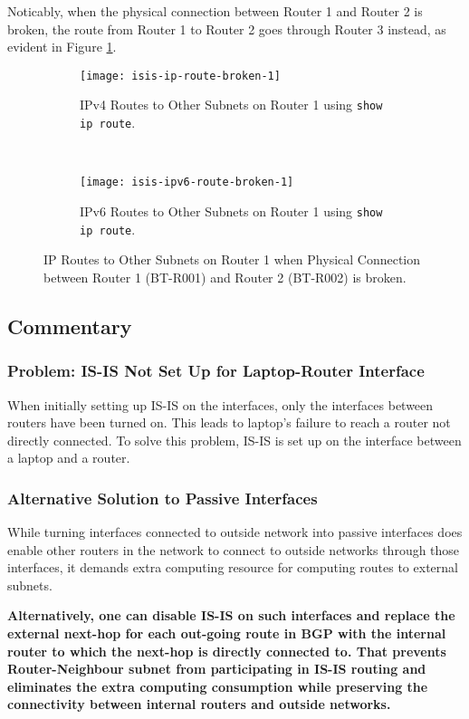 Noticably, when the physical connection between Router 1 and Router 2 is broken, the route from Router 1 to Router 2 goes through Router 3 instead, as evident in Figure \ref{fig:isis-ip-route-broken}.

\begin{figure}[ht!]
    \centering    
    \begin{subfigure}[b]{\textwidth}
        \centering
        \texttt{[image: isis-ip-route-broken-1]}
        \caption{IPv4 Routes to Other Subnets on Router 1 using \texttt{show ip route}.}
    \end{subfigure}
    ~
    \begin{subfigure}[b]{\textwidth}
        \centering
        \texttt{[image: isis-ipv6-route-broken-1]}
        \caption{IPv6 Routes to Other Subnets on Router 1 using \texttt{show ip route}.}
    \end{subfigure}
    \caption{IP Routes to Other Subnets on Router 1 when Physical Connection between Router 1 (BT-R001) and Router 2 (BT-R002) is broken.}
    \label{fig:isis-ip-route-broken}
\end{figure}

\subsection{Commentary}

\subsubsection{Problem: IS-IS Not Set Up for Laptop-Router Interface}
When initially setting up IS-IS on the interfaces, only the interfaces between routers have been turned on. This leads to laptop's failure to reach a router not directly connected.
To solve this problem, IS-IS is set up on the interface between a laptop and a router.

\subsubsection{Alternative Solution to Passive Interfaces}
\label{sec:isis-alternative}
While turning interfaces connected to outside network into passive interfaces does enable other routers in the network to connect to outside networks through those interfaces, it demands extra computing resource for computing routes to external subnets. 

\textbf{Alternatively, one can disable IS-IS on such interfaces and replace the external next-hop for each out-going route in BGP with the internal router to which the next-hop is directly connected to. That prevents Router-Neighbour subnet from participating in IS-IS routing and eliminates the extra computing consumption while preserving the connectivity between internal routers and outside networks.}


\clearpage



